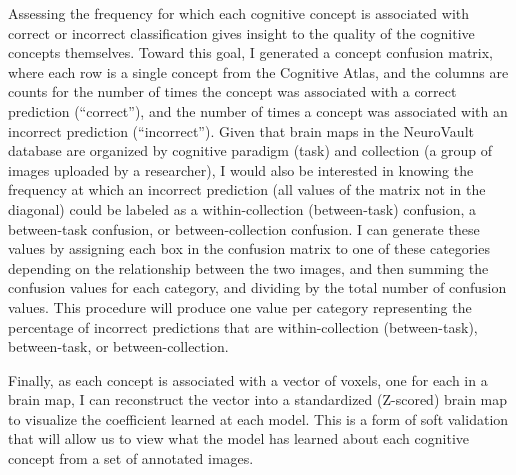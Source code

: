 \documentclass{report}
\begin{document}
Assessing the frequency for which each cognitive concept is associated
with correct or incorrect classification gives insight to the quality of
the cognitive concepts themselves. Toward this goal, I generated a
concept confusion matrix, where each row is a single concept from the
Cognitive Atlas, and the columns are counts for the number of times the
concept was associated with a correct prediction (``correct''), and the
number of times a concept was associated with an incorrect prediction
(``incorrect''). Given that brain maps in the NeuroVault database are
organized by cognitive paradigm (task) and collection (a group of images
uploaded by a researcher), I would also be interested in knowing the
frequency at which an incorrect prediction (all values of the matrix not
in the diagonal) could be labeled as a within-collection (between-task)
confusion, a between-task confusion, or between-collection
confusion. I can generate these values by assigning each box in the confusion matrix to one of these categories depending on the relationship between the two images, and then summing the confusion values for each category, and
dividing by the total number of confusion values. This procedure will
produce one value per category representing the percentage of incorrect
predictions that are within-collection (between-task), between-task, or
between-collection.

Finally, as each concept is associated with a vector of voxels, one for
each in a brain map, I can reconstruct the vector into a standardized
(Z-scored) brain map to visualize the coefficient learned at each model.
This is a form of soft validation that will allow us to view what the
model has learned about each cognitive concept from a set of annotated
images.
\end{document}
